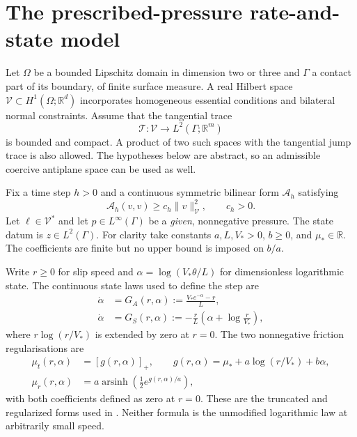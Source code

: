 \documentclass[11pt,a4paper]{article}
\theoremstyle{definition}\newtheorem{definition}[theorem]{Definition}
\theoremstyle{remark}\newtheorem{remark}[theorem]{Remark}
\newcommand{\R}{\mathbb R}
\newcommand{\norm}[1]{\lVert #1\rVert}
\newcommand{\pos}[1]{[#1]_+}
\newcommand{\asinh}{\operatorname{arsinh}}
\newcommand{\A}{\mathcal A}
\newcommand{\V}{\mathcal V}
\newcommand{\tr}{\mathcal T}
\numberwithin{equation}{section}
\begin{document}
\section{The prescribed-pressure rate-and-state model}\label{sec:model}
Let $\Omega$ be a bounded Lipschitz domain in dimension two or three and $\Gamma$ a contact part of its boundary, of finite surface measure. A real Hilbert space $\V\subset H^1(\Omega;\R^d)$ incorporates homogeneous essential conditions and bilateral normal constraints. Assume that the tangential trace
\[
 \tr:\V\longrightarrow L^2(\Gamma;\R^m)
\]
is bounded and compact. A product of two such spaces with the tangential jump trace is also allowed. The hypotheses below are abstract, so an admissible coercive antiplane space can be used as well.

Fix a time step $h>0$ and a continuous symmetric bilinear form $\A_h$ satisfying
\begin{equation}\label{eq:coercive}
 \A_h(v,v)\ge c_h\norm v_\V^2,\qquad c_h>0.
\end{equation}
Let $\ell\in\V^*$ and let $p\in L^\infty(\Gamma)$ be a \emph{given}, nonnegative pressure. The state datum is $z\in L^2(\Gamma)$. For clarity take constants $a,L,V_*>0$, $b\ge0$, and $\mu_*\in\R$. The coefficients are finite but no upper bound is imposed on $b/a$.

Write $r\ge0$ for slip speed and $\alpha=\log(V_*\theta/L)$ for dimensionless logarithmic state. The continuous state laws used to define the step are
\begin{align}
 \dot\alpha&=G_A(r,\alpha):=\frac{V_*e^{-\alpha}-r}{L},\label{eq:ageODE}\\
 \dot\alpha&=G_S(r,\alpha):=-\frac rL\left(\alpha+\log\frac r{V_*}\right),\label{eq:slipODE}
\end{align}
where $r\log(r/V_*)$ is extended by zero at $r=0$. The two nonnegative friction regularisations are
\begin{align}
 \mu_t(r,\alpha)&=\pos{g(r,\alpha)},\qquad
 g(r,\alpha)=\mu_*+a\log(r/V_*)+b\alpha,\label{eq:trunc}\\
 \mu_r(r,\alpha)&=a\asinh\!\left(\tfrac12 e^{g(r,\alpha)/a}\right),\label{eq:asinh}
\end{align}
with both coefficients defined as zero at $r=0$. These are the truncated and regularized forms used in \cite{PippingThesis,Pipping2019}. Neither formula is the unmodified logarithmic law at arbitrarily small speed.
\end{document}

